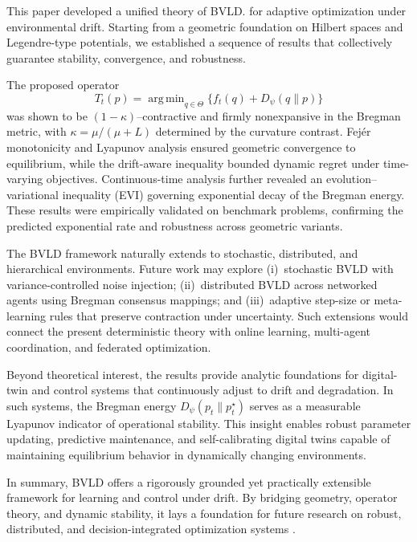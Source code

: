 \documentclass[11pt]{article}
\DeclareMathOperator*{\argmin}{arg\,min}
\theoremstyle{plain}
\theoremstyle{definition}
\theoremstyle{remark}
\begin{document}
This paper developed a unified theory of 
BVLD.
for adaptive optimization under environmental drift.
Starting from a geometric foundation on Hilbert spaces and Legendre-type potentials,
we established a sequence of results that collectively guarantee
stability, convergence, and robustness.

The proposed operator
\[
T_t(p)
=\argmin_{q\in\Theta}\{f_t(q)+D_\psi(q\|p)\}
\]
was shown to be $(1-\kappa)$--contractive and firmly nonexpansive in the Bregman metric,
with $\kappa=\mu/(\mu+L)$ determined by the curvature contrast.
Fej\'er monotonicity and Lyapunov analysis ensured
geometric convergence to equilibrium,
while the drift-aware inequality bounded dynamic regret under time-varying objectives.
Continuous-time analysis further revealed an evolution--variational inequality (EVI)
governing exponential decay of the Bregman energy.
These results were empirically validated on benchmark problems,
confirming the predicted exponential rate and robustness across geometric variants.

The BVLD framework naturally extends to stochastic,
distributed, and hierarchical environments.
Future work may explore
(i)~stochastic BVLD with variance-controlled noise injection;
(ii)~distributed BVLD across networked agents using Bregman consensus mappings; and
(iii)~adaptive step-size or meta-learning rules that preserve contraction under uncertainty.
Such extensions would connect the present deterministic theory with online learning,
multi-agent coordination, and federated optimization.

Beyond theoretical interest, the results provide analytic foundations for
digital-twin and control systems that continuously adjust to drift and degradation.
In such systems, the Bregman energy $D_\psi(p_t\|p_t^\star)$
serves as a measurable Lyapunov indicator of operational stability.
This insight enables robust parameter updating, predictive maintenance,
and self-calibrating digital twins capable of maintaining equilibrium behavior
in dynamically changing environments.

In summary, BVLD offers a rigorously grounded yet practically extensible
framework for learning and control under drift.
By bridging geometry, operator theory, and dynamic stability,
it lays a foundation for future research on robust,
distributed, and decision-integrated optimization systems
\cite{Bauschke2017,Bolte2018,Mordukhovich2018}.
\end{document}
